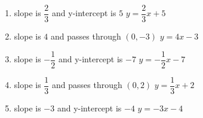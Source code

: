 \begin{enumerate}[resume]
    		\item  slope is $ \dfrac{2}{3} $ and y-intercept is $ 5 $ $ y = \dfrac{2}{3}x + 5 $
			\item  slope is $ 4 $ and passes through $ (0, -3) $ $ y = 4x - 3 $
			\item slope is $ -\dfrac{1}{2} $ and y-intercept is $ -7 $	$ y = -\dfrac{1}{2}x - 7 $
			\item  slope is $ \dfrac{1}{3} $ and passes through $ (0, 2) $ $ y = \dfrac{1}{3}x + 2 $
			\item  slope is $ -3 $ and y-intercept is $ -4 $ $ y = -3x - 4$
\end{enumerate}   

